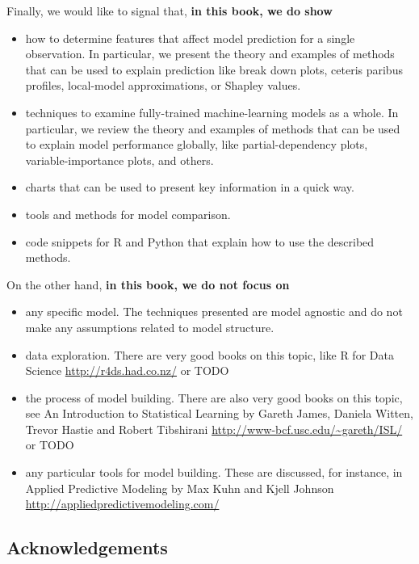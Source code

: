 \documentclass[12pt,]{krantz}
\providecommand{\tightlist}{%
  \setlength{\itemsep}{0pt}\setlength{\parskip}{0pt}}
\begin{document}
Finally, we would like to signal that, \textbf{in this book, we do show}

\begin{itemize}
\tightlist
\item
  how to determine features that affect model prediction for a single observation. In particular, we present the theory and examples of methods that can be used to explain prediction like break down plots, ceteris paribus profiles, local-model approximations, or Shapley values.
\item
  techniques to examine fully-trained machine-learning models as a whole. In particular, we review the theory and examples of methods that can be used to explain model performance globally, like partial-dependency plots, variable-importance plots, and others.
\item
  charts that can be used to present key information in a quick way.
\item
  tools and methods for model comparison.
\item
  code snippets for R and Python that explain how to use the described methods.
\end{itemize}

On the other hand, \textbf{in this book, we do not focus on}

\begin{itemize}
\tightlist
\item
  any specific model. The techniques presented are model agnostic and do not make any assumptions related to model structure.
\item
  data exploration. There are very good books on this topic, like R for Data Science \url{http://r4ds.had.co.nz/} or TODO
\item
  the process of model building. There are also very good books on this topic, see An Introduction to Statistical Learning by Gareth James, Daniela Witten, Trevor Hastie and Robert Tibshirani \url{http://www-bcf.usc.edu/~gareth/ISL/} or TODO
\item
  any particular tools for model building. These are discussed, for instance, in Applied Predictive Modeling by Max Kuhn and Kjell Johnson \url{http://appliedpredictivemodeling.com/}
\end{itemize}

\hypertarget{thanksto}{%
\subsection{Acknowledgements}\label{thanksto}}
\end{document}
